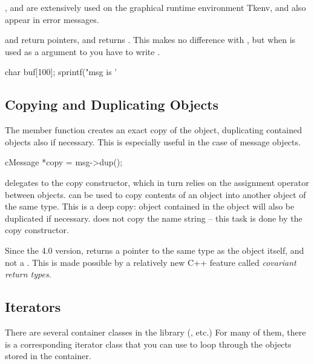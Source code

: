 ,  and 
are extensively used on the graphical runtime environment Tkenv,
and also appear in error messages.

 and  return  pointers,
and  returns . This makes no difference
with , but when  is used as a  argument
to  you have to write .

\begin{cpp}
char buf[100];
sprintf("msg is '%
\end{cpp}


\subsection{Copying and Duplicating Objects}


The  member function creates an exact copy of the
object, duplicating
contained objects also if necessary. This is especially useful in the
case of message objects.

\begin{cpp}
cMessage *copy = msg->dup();
\end{cpp}

 delegates to the copy constructor, which in
turn relies on the assignment operator between objects.
 can be used to copy contents of an object into
another object of the same type. This is a deep copy: object
contained in the object will also be duplicated if necessary.
 does not copy the name string -- this task is done
by the copy constructor.

\begin{note}
    Since the {\opp} 4.0 version,  returns a pointer to
    the same type as the object itself, and not a .
    This is made possible by a relatively new C++ feature called
    \textit{covariant return types}.
\end{note}

\subsection{Iterators}


There are several container classes in the library (,
 etc.) For many of them, there is a corresponding
iterator class that you can use to loop through the objects stored in
the container.

